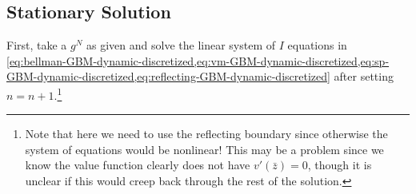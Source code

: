 \documentclass[11pt]{article}
\begin{document}
%

\subsection{Stationary Solution}
First, take a $g^N$ as given and solve the linear system of $I$ equations in \cref{eq:bellman-GBM-dynamic-discretized,eq:vm-GBM-dynamic-discretized,eq:sp-GBM-dynamic-discretized,eq:reflecting-GBM-dynamic-discretized} after setting $n = n+1$.\footnote{Note that here we need to use the reflecting boundary since otherwise the system of equations would be nonlinear!  This may be a problem since we know the value function clearly does not have $v'(\bar{z}) = 0$, though it is unclear if this would creep back through the rest of the solution.}
\end{document}
